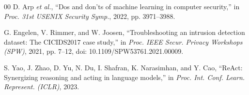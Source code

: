 \documentclass[conference]{IEEEtran}
\begin{document}
\begin{thebibliography}{00}
 D. Arp \emph{et al.}, ``Dos and don'ts of machine
learning in computer security,'' in \emph{Proc. 31st USENIX Security
Symp.}, 2022, pp. 3971--3988.

 G. Engelen, V. Rimmer, and W. Joosen,
``Troubleshooting an intrusion detection dataset: The CICIDS2017 case
study,'' in \emph{Proc. IEEE Secur. Privacy Workshops (SPW)}, 2021,
pp. 7--12, doi: 10.1109/SPW53761.2021.00009.

 S. Yao, J. Zhao, D. Yu, N. Du, I. Shafran,
K. Narasimhan, and Y. Cao, ``ReAct: Synergizing reasoning and acting in
language models,'' in \emph{Proc. Int. Conf. Learn. Represent.
(ICLR)}, 2023.

\end{thebibliography}
\end{document}
